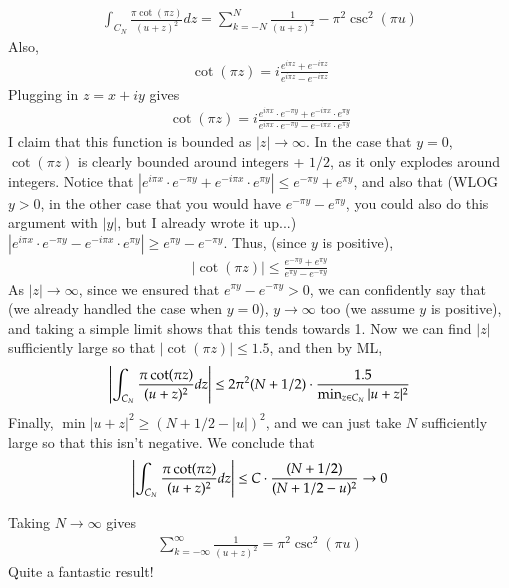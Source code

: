 \documentclass[12pt]{article}
\theoremstyle{definitionstyle}
\begin{document}
\begin{enumerate}[leftmargin=\labelsep]
		\begin{align*}
			\int_{C_N} \frac{\pi\cot(\pi z)}{(u+z)^2}dz = \sum_{k=-N}^{N} \frac{1}{(u+z)^2} -\pi^2 \csc^2(\pi u)
		\end{align*}
		Also,
		\begin{align*}
			\cot(\pi z) = i\frac{e^{i \pi z} + e^{-i \pi z}}{e^{i\pi z} - e^{-i \pi z}}
		\end{align*}
		Plugging in $z = x + iy$ gives
		\begin{align*}
			\cot(\pi z) = i\frac{e^{i \pi x} \cdot e^{-\pi y} + e^{-i \pi x} \cdot e^{\pi y}}{e^{i \pi x} \cdot e^{-\pi y} - e^{-i \pi x} \cdot e^{\pi y}}
		\end{align*}
		I claim that this function is bounded as $|z| \to \infty$. In the case that $y = 0$, $\cot(\pi z)$ is clearly bounded around integers + $1/2$, as it only explodes around integers. Notice that $|e^{i \pi x} \cdot e^{-\pi y} + e^{-i \pi x} \cdot e^{\pi y}| \leq e^{-\pi y} + e^{\pi y}$, and also that (WLOG $y > 0$, in the other case that you would have $e^{- \pi y} - e^{\pi y}$, you could also do this argument with $|y|$, but I already wrote it up...) $|e^{i \pi x} \cdot e^{-\pi y} - e^{-i \pi x} \cdot e^{\pi y}| \geq e^{\pi y} - e^{- \pi y}$. Thus, (since $y$ is positive),
		\begin{align*}
			|\cot(\pi z)| \leq \frac{e^{-\pi y} + e^{\pi y}}{e^{\pi y} - e^{- \pi y}}
		\end{align*}
		As $|z| \to \infty$, since we ensured that $e^{\pi y} - e^{- \pi y} > 0$, we can confidently say that (we already handled the case when $y = 0$), $y \to \infty$ too (we assume $y$ is positive), and taking a simple limit shows that this tends towards 1. Now we can find $|z|$ sufficiently large so that $|\cot(\pi z)| \leq 1.5$, and then by ML,
		\begin{align*}
			\qty|\int_{C_N} \frac{\pi \cot(\pi z)}{(u+z)^2}dz| \leq 2\pi^2 (N+1/2) \cdot \frac{1.5}{\min_{z \in C_N} |u+z|^2}
		\end{align*}
		Finally, $\min |u+z|^2 \geq (N + 1/2 - |u|)^2$, and we can just take $N$ sufficiently large so that this isn't negative. We conclude that
		\begin{align*}
			\qty|\int_{C_N} \frac{\pi \cot(\pi z)}{(u+z)^2}dz| \leq C \cdot \frac{(N + 1/2)}{(N + 1/2 - u)^2} \to 0
		\end{align*}
	
		Taking $N \to \infty$ gives 
		\begin{align*}
			\sum_{k=-\infty}^{\infty} \frac{1}{(u+z)^2} = \pi^2 \csc^2(\pi u)
		\end{align*}
		Quite a fantastic result!
		

\end{enumerate}
\end{document}
